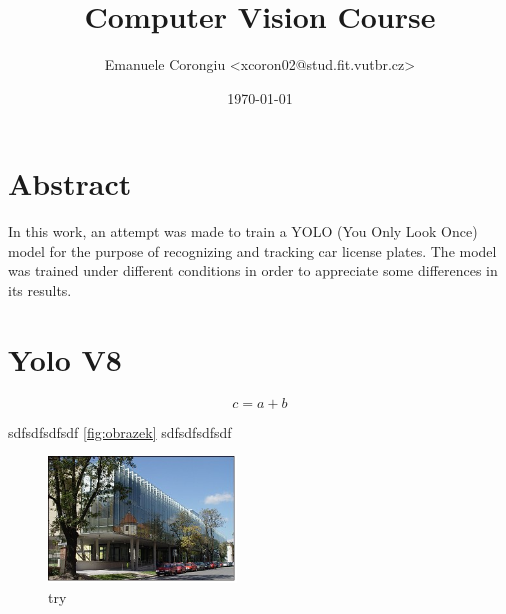 \documentclass[12pt]{article}
\title{Computer Vision Course}
\author{Emanuele Corongiu <xcoron02@stud.fit.vutbr.cz>}
\date{\today}
\begin{document}


\section{Abstract}
In this work, an attempt was made to train a YOLO (You Only Look Once) model for the purpose of recognizing and tracking car license plates. The model was trained under different conditions in order to appreciate some differences in its results.


\section{Yolo V8}



\begin{equation}
  \label{moje-rovnice}
  c = a + b
\end{equation}

sdfsdfsdfsdf \ref{fig:obrazek} sdfsdfsdfsdf

\begin{figure}[htb]
  \centering
  \includegraphics[width=5cm,keepaspectratio]{obrazek.jpg}
  \caption{try \cite{wikipedia}}
  \label{fig:try}
\end{figure}






\begin{flushleft}
  
\end{flushleft}

\end{document}
